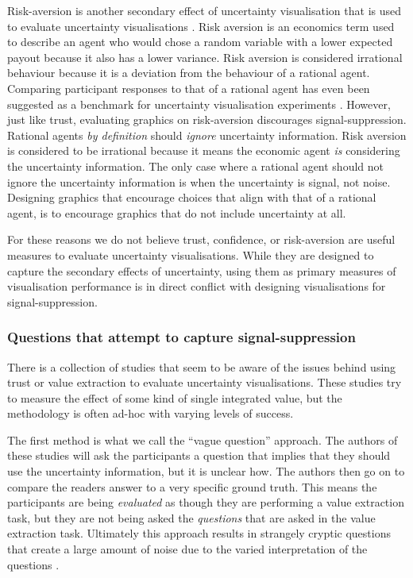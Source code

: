 \documentclass[
  12pt]{article}
\begin{document}
Risk-aversion is another secondary effect of uncertainty visualisation
that is used to evaluate uncertainty visualisations \citep{Hullman2019}.
Risk aversion is an economics term used to describe an agent who would
chose a random variable with a lower expected payout because it also has
a lower variance. Risk aversion is considered irrational behaviour
because it is a deviation from the behaviour of a rational agent.
Comparing participant responses to that of a rational agent has even
been suggested as a benchmark for uncertainty visualisation experiments
\citep{wu2023rational}. However, just like trust, evaluating graphics on
risk-aversion discourages signal-suppression. Rational agents \emph{by
definition} should \emph{ignore} uncertainty information. Risk aversion
is considered to be irrational because it means the economic agent
\emph{is} considering the uncertainty information. The only case where a
rational agent should not ignore the uncertainty information is when the
uncertainty is signal, not noise. Designing graphics that encourage
choices that align with that of a rational agent, is to encourage
graphics that do not include uncertainty at all.

For these reasons we do not believe trust, confidence, or risk-aversion
are useful measures to evaluate uncertainty visualisations. While they
are designed to capture the secondary effects of uncertainty, using them
as primary measures of visualisation performance is in direct conflict
with designing visualisations for signal-suppression.

\subsubsection{Questions that attempt to capture
signal-suppression}\label{questions-that-attempt-to-capture-signal-suppression}

There is a collection of studies that seem to be aware of the issues
behind using trust or value extraction to evaluate uncertainty
visualisations. These studies try to measure the effect of some kind of
single integrated value, but the methodology is often ad-hoc with
varying levels of success.

The first method is what we call the ``vague question'' approach. The
authors of these studies will ask the participants a question that
implies that they should use the uncertainty information, but it is
unclear how. The authors then go on to compare the readers answer to a
very specific ground truth. This means the participants are being
\emph{evaluated} as though they are performing a value extraction task,
but they are not being asked the \emph{questions} that are asked in the
value extraction task. Ultimately this approach results in strangely
cryptic questions that create a large amount of noise due to the varied
interpretation of the questions \citep{Hullman2016}.
\end{document}
